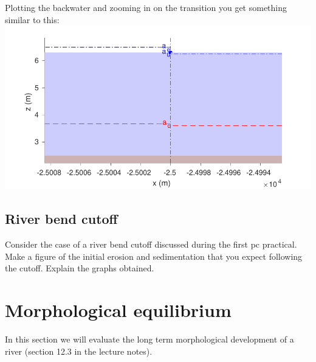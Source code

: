 \documentclass[a4paper]{article}
\begin{document}
\begin{solution}
  Plotting the backwater and zooming in on the transition you get something similar to this:
  \includegraphics[width=\linewidth]{matlab/zoom_backwater.pdf}
\end{solution}
\subsection{River bend cutoff}
\begin{exercise}
  Consider the case of a river bend cutoff discussed during the first pc practical. Make a figure of the initial erosion and sedimentation that you expect following the cutoff. Explain the graphs obtained.
\end{exercise}

\section{Morphological equilibrium}
In this section we will evaluate the long term morphological development of a river (section 12.3 in the lecture notes).
\end{document}
